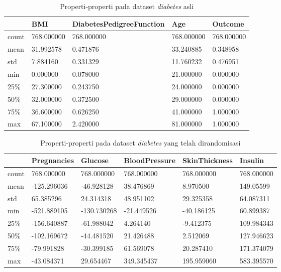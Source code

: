 \begin{itemize}
	\begin{table}
		\centering
		\caption{Properti-properti pada dataset \textit{diabetes} asli}
		\begin{tabular}{l|llll}
			\hline
			 & BMI & DiabetesPedigreeFunction & Age & Outcome \\ \hline
			count & 768.000000 & 768.000000 & 768.000000 & 768.000000 \\
			mean & 31.992578 & 0.471876 & 33.240885 & 0.348958 \\
			std & 7.884160 & 0.331329 & 11.760232 & 0.476951 \\
			min & 0.000000 & 0.078000 & 21.000000 & 0.000000 \\
			25\% & 27.300000 & 0.243750 & 24.000000 & 0.000000\\
			50\% & 32.000000 & 0.372500 & 29.000000 & 0.000000 \\
			75\% & 36.600000 & 0.626250 & 41.000000 & 1.000000 \\
			max & 67.100000 & 2.420000 & 81.000000 & 1.000000 \\
			\hline
		\end{tabular}
		\label{table:properti-diabetes-asli-2}
	\end{table}
	
	\begin{table}
		\centering
		\caption{Properti-properti pada dataset \textit{diabetes} yang telah dirandomisasi}
		\begin{tabular}{l|lllll}
			\hline
			 & Pregnancies & Glucose & BloodPressure & SkinThickness & Insulin \\ \hline
			count & 768.000000 & 768.000000 & 768.000000 & 768.000000 & 768.000000 \\
			mean & -125.296036 & -46.928128 & 38.476869 & 8.970500 & 149.05599 \\
			std & 65.385296 & 24.314318 & 48.951102 & 29.325358 & 64.087311 \\
			min & -521.889105 & -130.730268 & -21.449526 & -40.186125 & 60.899387\\
			25\% & -156.640887 & -61.988042 & 4.264140 & -9.412375 & 109.984343 \\
			50\% & -102.169672 & -44.481520 & 21.426488 & 2.512069 & 127.946623 \\
			75\% & -79.991828 & -30.399185 & 61.569078 & 20.287410 & 171.374079 \\
			max & -43.084371 & 29.654467 & 349.345437 & 195.959060 & 583.395570 \\
			\hline
		\end{tabular}
		\label{table:properti-diabetes-randomisasi-1}
	\end{table}
	

\end{itemize}

